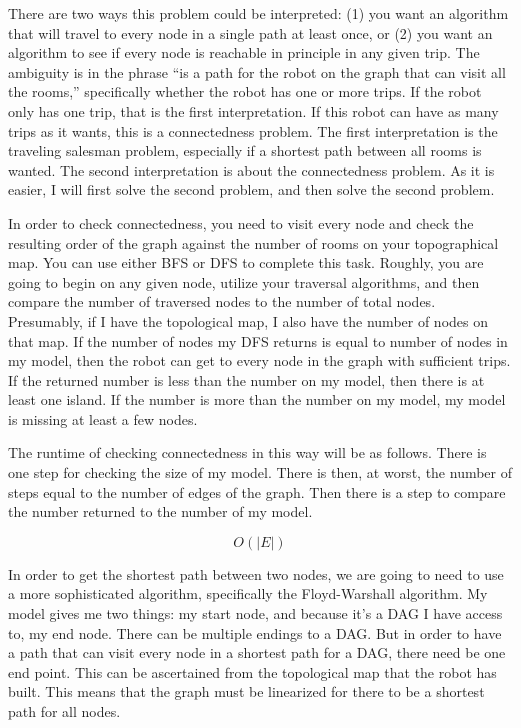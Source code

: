 \documentclass[11pt]{article}
\begin{document}
There are two ways this problem could be interpreted: (1) you want an algorithm
that will travel to every node in a single path at least once, or (2) you want
an algorithm to see if every node is reachable in principle in any given trip.
The ambiguity is in the phrase ``is a path for the robot on the graph that can 
visit all the rooms,'' specifically whether the robot has one or more trips.
If the robot only has one trip, that is the first interpretation. If this
robot can have as many trips as it wants, this is a connectedness problem.
The first interpretation is the traveling salesman problem, especially if a
shortest path between all rooms is wanted. The second interpretation is about
the connectedness problem. As it is easier, I will first solve the second 
problem, and then solve the second problem. 

In order to check connectedness, you need to visit every node and check the
resulting order of the graph against the number of rooms on your topographical
map.
You can use either BFS or DFS to complete this task. Roughly, you are going
to begin on any given node, utilize your traversal algorithms, and then compare
the number of traversed nodes to the number of total nodes. Presumably, if I have
the topological map, I also have the number of nodes on that map. If the number
of nodes my DFS returns is equal to number of nodes in my model, then the robot
can get to every node in the graph with sufficient trips. 
If the returned number is less than the number on my
model, then there is at least one island. If the number is more than the number
on my model, my model is missing at least a few nodes.

The runtime of checking connectedness in this way will be as follows. There
is one step for checking the size of my model. There is then, at worst, 
the number of steps equal to the number of edges of the graph. Then there is
a step to compare the number returned to the number of my model.

$$O(|E|)$$

In order to get the shortest path between two nodes, we are going to
need to use a more sophisticated algorithm, specifically the Floyd-Warshall algorithm. My model gives me two things: my start node, and because it's
a DAG I have access to, my end node. There can be multiple endings to a
DAG. But in order to have a path that can visit every node in a shortest
path for a DAG, there need be one end point. This can be ascertained from the
topological map that the robot has built. This means that the graph must
be linearized for there to be a shortest path for all nodes.
\end{document}
